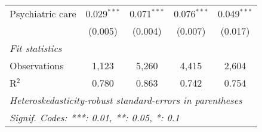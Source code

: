 \begin{tabular}{lcccc}
   Psychiatric care        & 0.029$^{***}$ & 0.071$^{***}$ & 0.076$^{***}$ & 0.049$^{***}$\\   
                           & (0.005)       & (0.004)       & (0.007)       & (0.017)\\   
   \midrule
   \emph{Fit statistics}\\
   Observations            & 1,123         & 5,260         & 4,415         & 2,604\\  
   R$^2$                   & 0.780         & 0.863         & 0.742         & 0.754\\  
   \midrule \midrule
   \multicolumn{5}{l}{\emph{Heteroskedasticity-robust standard-errors in parentheses}}\\
   \multicolumn{5}{l}{\emph{Signif. Codes: ***: 0.01, **: 0.05, *: 0.1}}\\
\end{tabular}
\par\endgroup


